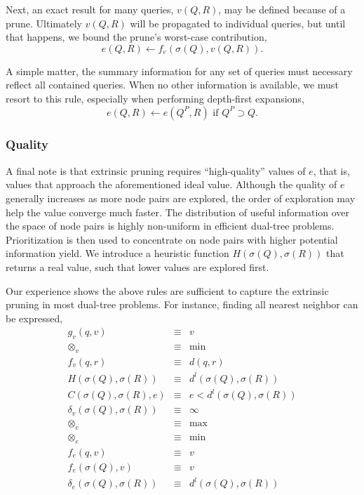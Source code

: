 \documentclass[twoside,leqno,twocolumn]{article}
\newcommand{\summary}{\delta}
\newcommand{\mysubsub}[1]{\subsubsection{#1} }
\newcommand{\kdparent}[1]{#1^{\!P}}
\newcommand{\lo}[1]{#1^{l}}
\newcommand{\distlo}{\lo{d}}
\newcommand{\dist}[2]{d(#1,#2)}
\newcommand{\nameop}[2]{#1_{\!#2}}
\newcommand{\myop}[1]{\nameop{\otimes}{#1}}
\newcommand{\letterqr}{v}
\newcommand{\inqr}{v}
\newcommand{\opqr}{\myop{\letterqr}}
\newcommand{\fqr}{f_{\letterqr}}
\newcommand{\gqr}{g_{\letterqr}}
\newcommand{\letterqrv}{v}
\newcommand{\inqrv}{v}
\newcommand{\deltaqrv}{\summary_{\letterqrv}}
\newcommand{\lettermu}{e}
\newcommand{\inmu}{e}
\newcommand{\outopmu}{\myop{\lettermu}}
\newcommand{\opmu}{\myop{\lettermu}}
\newcommand{\fmu}{f_{\lettermu}}
\newcommand{\fmuv}{f_{\lettermu}}
\newcommand{\deltamu}{\summary_{\lettermu}}
\newcommand{\canprunemu}{C}
\newcommand{\heurqr}{H}
\newcommand{\outstat}{\sigma}
\begin{document}
Next, an exact result for many queries, $\inqrv(Q, R)$, may be defined because of a prune.
Ultimately $\inqrv(Q, R)$ will be propagated to individual queries, but until that happens, we bound the prune's worst-case contribution,
\begin{equation}
\inmu(Q, R) \gets \fmuv(\outstat(Q), \inqrv(Q, R)).
\label{eqn:muprune}
\end{equation}

\noindent
A simple matter, the summary information for any set of queries must necessary reflect all contained queries.
When no other information is available, we must resort to this rule, especially when performing depth-first expansions,
\begin{equation}
\inmu(Q, R) \gets \inmu(\kdparent{Q}, R) \text{ if } \kdparent{Q} \supset Q.
\label{eqn:muparent}
\end{equation}

\mysubsub{Quality}
A final note is that extrinsic pruning requires ``high-quality'' values of $\inmu$, that is, values that approach the aforementioned ideal value.
Although the quality of $\lettermu$ generally increases as more node pairs are explored, the order of exploration may help the value converge much faster.
The distribution of useful information over the space of node pairs is highly non-uniform in efficient dual-tree problems.
Prioritization is then used to concentrate on node pairs with higher potential information yield.
We introduce a heuristic function $\heurqr(\outstat(Q),\outstat(R))$ that returns a real value, such that lower values are explored first.

Our experience shows the above rules are sufficient to capture the extrinsic pruning in most dual-tree problems.
For instance, finding all nearest neighbor can be expressed,
\begin{eqnarray*}
\gqr(q, \inqr) &\equiv& \inqr
\\
\opqr &\equiv& \min
\\
\fqr(q,r) &\equiv& \dist{q}{r}
\\
\heurqr(\outstat(Q),\outstat(R)) &\equiv& \distlo(\outstat(Q), \outstat(R))
\\
\canprunemu(\outstat(Q), \outstat(R), \lettermu)
 &\equiv& \lettermu < \distlo(\outstat(Q), \outstat(R))
\\
\deltaqrv(\outstat(Q),\outstat(R)) &\equiv& \infty
\\
\outopmu &\equiv& \max
\\
\opmu &\equiv& \min
\\
\fmu(q, \letterqr) &\equiv& \letterqr
\\
\fmuv(\outstat(Q), \letterqrv) &\equiv& \letterqrv
\\
\deltamu(\outstat(Q),\outstat(R)) &\equiv& \distlo(\outstat(Q),\outstat(R))
\end{eqnarray*}
\end{document}
